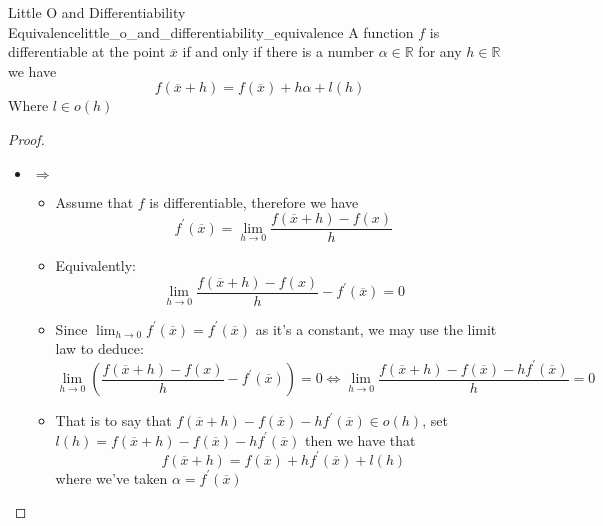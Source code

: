 \begin{proposition}{Little O and Differentiability Equivalence}{little_o_and_differentiability_equivalence}
  A function $f$ is differentiable at the point $\overline{x}$ if and only if there is a number $ \alpha \in \mathbb{R}$ for any $h \in \mathbb{R}$ we have 
  \[
  f\left(\overline{x}  +  h\right) = f\left(\overline{x}\right)  +  h \alpha  +  l\left(h\right)
  \]
  Where $l \in o\left(h\right) $ 

\end{proposition}

\begin{proof}
    \begin{itemize}
      \item $\Rightarrow$ 
        \begin{itemize}
          \item Assume that $f$ is differentiable, therefore we have
              \[
              f ^{ \prime } \left( \overline{x} \right) =  \lim_{ h \to 0 } \frac{f\left( \overline{x} +  h \right) -  f\left( x \right) }{h}
              \]
            \item Equivalently:
              \[
               \lim_{ h \to 0 } \frac{f\left( \overline{x} +  h \right) -  f\left( x \right) }{h} -  f ^{ \prime } \left( \overline{x} \right) = 0
              \]
            \item Since $ \lim_{ h \to 0 } f ^{ \prime } \left( \overline{x} \right) = f ^{ \prime } \left( \overline{x} \right)  $ as it's a constant, we may use the limit law to deduce:
            \[
            \lim_{ h \to 0 } \left( \frac{f\left( \overline{x} + h \right) - f\left( x \right) }{h} - f ^{ \prime } \left( \overline{x} \right) \right) = 0 \Leftrightarrow \lim_{ h \to 0 } \frac{f\left( \overline{x} + h \right) - f\left( \overline{x} \right) - h f ^{ \prime } \left( \overline{x} \right) }{h}= 0
            \]
            \item That is to say that $ f\left( \overline{x} + h \right) - f\left( \overline{x} \right) - h f ^{ \prime } \left( \overline{x} \right) \in o\left( h \right)  $, set $ l\left( h \right) = f\left( \overline{x} + h \right) - f\left( \overline{x} \right) - h f ^{ \prime } \left( \overline{x} \right)  $ then we have that
            \[
            f\left( \overline{x} + h \right) =  f\left( \overline{x} \right) +  h f ^{ \prime } \left( \overline{x} \right) +  l\left( h \right) 
            \]
            where we've taken $ \alpha = f ^{ \prime } \left( \overline{x} \right)  $ 
        \end{itemize}

\end{itemize}
\end{proof}
